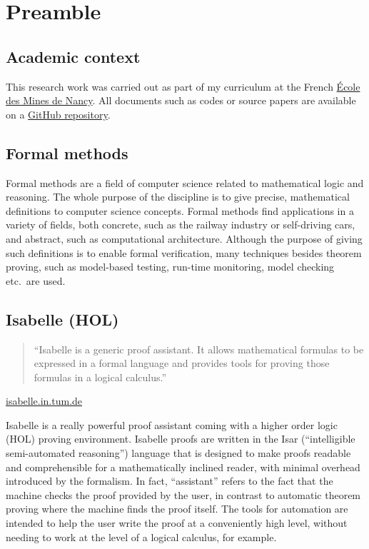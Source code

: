 \documentclass[a4 paper, 12pt]{article}
\begin{document}
\pagebreak


\tableofcontents

\pagebreak

\section{Preamble}
\subsection{Academic context}
This research work was carried out as part of my curriculum at the French \href{https://mines-nancy.univ-lorraine.fr}{École des Mines de Nancy}. All documents such as codes or source papers are available on a \href{https://github.com/VTrelat/Tarjan}{GitHub repository}.

\subsection{Formal methods}
Formal methods are a field of computer science related to mathematical logic and reasoning. The whole purpose of the discipline is to give precise, mathematical definitions to computer science concepts. Formal methods find applications in a variety of fields, both concrete, such as the railway industry or self-driving cars, and abstract, such as computational architecture. Although the purpose of giving such definitions is to enable formal verification, many techniques besides theorem proving, such as model-based testing, run-time monitoring, model checking etc.\ are used.

\subsection{Isabelle (HOL)}
\begin{quote}
    ``Isabelle is a generic proof assistant. It allows mathematical formulas to be expressed in a formal language and provides tools for proving those formulas in a logical calculus.''
\end{quote}
\begin{flushright}
    \href{https://isabelle.in.tum.de/}{isabelle.in.tum.de}
\end{flushright}
Isabelle \cite{nipkow_isabellehol_2002} is a really powerful proof assistant coming with a higher order logic (HOL) proving environment. Isabelle proofs are written in the Isar (``intelligible semi-automated reasoning'') language that is designed to make proofs readable and comprehensible for a mathematically inclined reader, with minimal overhead introduced by the formalism. In fact, ``assistant'' refers to the fact that the machine checks the proof provided by the user, in contrast to automatic theorem proving where the machine finds the proof itself. The tools for automation are intended to help the user write the proof at a conveniently high level, without needing to work at the level of a logical calculus, for example.
\end{document}

